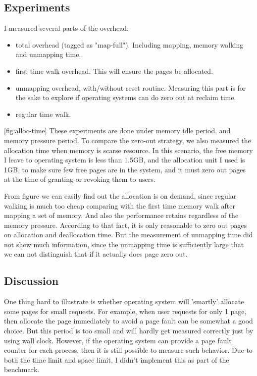 \subsection{Experiments}
I measured several parts of the overhead: 
\begin{itemize}
\item total overhead (tagged as "map-full"). Including mapping, memory walking
and unmapping time.
\item first time walk overhead. This will ensure the pages be allocated.
\item unmapping overhead, with/without reset routine. Measuring this part is
for the sake to explore if operating systems can do zero out at reclaim time.
\item regular time walk.
\end{itemize}
\ref{fig:alloc-time}
These experiments are done under memory idle period, and memory pressure
period. To compare the zero-out strategy, we also measured the allocation
time when memory is scarse resource. In this scenario, the free memory I leave
to operating system is less than 1.5GB, and the allocation unit I used is
1GB, to make sure few free pages are in the system, and it must zero out pages
at the time of granting or revoking them to users.

From figure we can easily find out the allocation is on demand, since regular
walking is much too cheap comparing with the first time memory walk after
mapping a set of memory. And also the performance retains regardless of the
memory pressure. According to that fact, it is only reasonable to zero out
pages on allocation and deallocation time. But the measurement of unmapping
time did not show much information, since the unmapping time is sufficiently
large that we can not distinguish that if it actually does page zero out.

\subsection{Discussion}
One thing hard to illustrate is whether operating system will 'smartly'
allocate some pages for small requests. For example, when user requests for
only 1 page, then allocate the page immediately to avoid a page fault can be
somewhat a good choice. But this period is too small and will hardly get 
measured correctly just by using wall clock. However, if the operating system
can provide a page fault counter for each process, then it is still possible
to measure such behavior. Due to both the time limit and space limit, I
didn't implement this as part of the benchmark.

